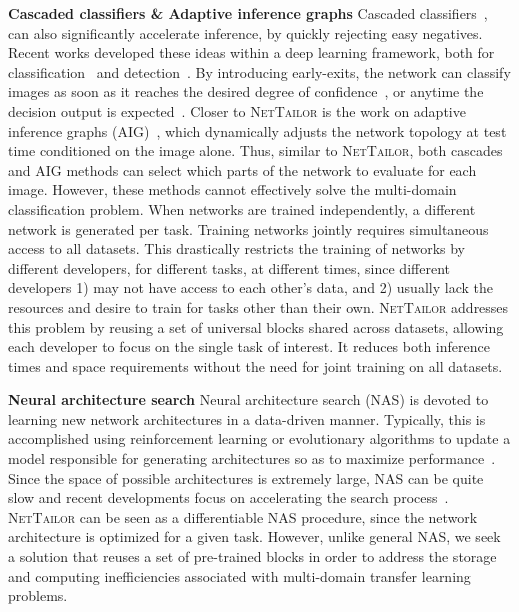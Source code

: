 \documentclass[10pt,twocolumn,letterpaper]{article}
\begin{document}
\noindent
{\bf Cascaded classifiers \& Adaptive inference graphs}
Cascaded classifiers~\cite{viola2001rapid}, can also significantly accelerate inference, by quickly rejecting easy negatives. 
Recent works developed these ideas within a deep learning framework, both for classification~\cite{teerapittayanon2016branchynet,huang2017multi} and detection~\cite{cai2015learning,yang2016exploit}.
By introducing early-exits, the network can classify images as soon as it reaches the desired degree of confidence~\cite{huang2017multi,teerapittayanon2016branchynet}, or anytime the decision output is expected~\cite{huang2017multi}.
Closer to \textsc{NetTailor} is the work on adaptive inference graphs (AIG)~\cite{veit2018convolutional,figurnov2017spatially}, which dynamically adjusts the network topology at test time conditioned on the image alone.
Thus, similar to \textsc{NetTailor}, both cascades and AIG methods can select which parts of the network to evaluate for each image.
However, these methods cannot effectively solve the multi-domain classification problem.
When networks are trained independently, a different network is generated per task. 
Training networks jointly requires simultaneous access to all datasets. This drastically restricts the training of networks by different developers, for different tasks, at different times, since different developers 1) may not have access to each other's data, and 2) usually lack the resources and desire to train for tasks other than their own. \textsc{NetTailor} addresses this problem by reusing a set of universal blocks shared across datasets, allowing each developer to focus on the single task of interest. It reduces both inference times and space requirements without the need for joint training on all datasets.














\noindent
{\bf Neural architecture search}
Neural architecture search (NAS) is devoted to learning new network architectures in a data-driven manner.
Typically, this is accomplished using reinforcement learning or evolutionary algorithms to update a model responsible for generating architectures so as to maximize performance~\cite{zoph2016neural,zoph2017learning}.
Since the space of possible architectures is extremely large, NAS can be quite slow and recent developments focus on accelerating the search process~\cite{liu2017progressive,liu2018darts}. 
\textsc{NetTailor} can be seen as a differentiable NAS procedure, since the network architecture is optimized for a given task. 
However, unlike general NAS, we seek a solution that reuses a set of pre-trained blocks in order to address the storage and computing inefficiencies associated with multi-domain transfer learning problems.
\end{document}
